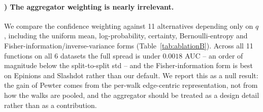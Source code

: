 \documentclass[sigconf, review, anonymous]{acmart}
\newcounter{ablation}
\renewcommand{\theablation}{\Alph{ablation}}
\theoremstyle{plain}
\theoremstyle{definition}
\begin{document}
%

\paragraph{\theablation) The aggregator weighting is nearly irrelevant.}
\label{abl:aggregator}
We compare the confidence weighting against 11 alternatives depending only on $q$, including the uniform mean, log-probability, certainty, Bernoulli-entropy and Fisher-information/inverse-variance forms (Table~\ref{tab:ablationB}). Across all 11 functions on all 6 datasets the full spread is under $0.0018$ AUC -- an order of magnitude below the split-to-split std -- and the Fisher-information form is best on Epinions and Slashdot rather than our default. We report this as a null result: the gain of Pewter comes from the per-walk edge-centric representation, not from how the walks are pooled, and the aggregator should be treated as a design detail rather than as a contribution.
\end{document}
